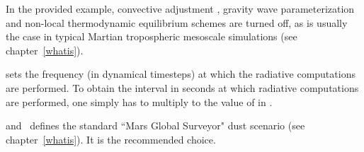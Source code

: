 \mk
\begin{finger}
\item In the provided example, convective adjustment , gravity wave parameterization  and non-local thermodynamic equilibrium schemes  are turned off, as is usually the case in typical Martian tropospheric mesoscale simulations (see chapter~\ref{whatis}).
\item {} sets the frequency (in dynamical timesteps) at which the radiative computations are performed. To obtain the interval in seconds at which radiative computations are performed, one simply has to multiply  to the value of  in .
\item {} and~ defines the standard ``Mars Global Surveyor" dust scenario (see chapter~\ref{whatis}). It is the recommended choice.
\end{finger}

\clearemptydoublepage
